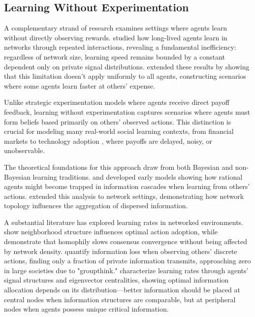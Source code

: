 \documentclass[a4paper,12pt]{report}
\begin{document}
\subsection{Learning Without Experimentation}

A complementary strand of research examines settings where agents learn without directly observing rewards. \citet{huang2024learning} studied how long-lived agents learn in networks through repeated interactions, revealing a fundamental inefficiency: regardless of network size, learning speed remains bounded by a constant dependent only on private signal distributions. \citet{brandl2024} extended these results by showing that this limitation doesn't apply uniformly to all agents, constructing scenarios where some agents learn faster at others' expense.

Unlike strategic experimentation models where agents receive direct payoff feedback, learning without experimentation captures scenarios where agents must form beliefs based primarily on others' observed actions. This distinction is crucial for modeling many real-world social learning contexts, from financial markets \citep{avery1998multidimensional} to technology adoption \citep{ellison1993rules}, where payoffs are delayed, noisy, or unobservable.

The theoretical foundations for this approach draw from both Bayesian and non-Bayesian learning traditions. \citet{gale2003bayesian} and \citet{smith2000pathological} developed early models showing how rational agents might become trapped in information cascades when learning from others' actions. \citet{acemoglu2011bayesian} extended this analysis to network settings, demonstrating how network topology influences the aggregation of dispersed information.

A substantial literature has explored learning rates in networked environments. \cite{bala1998learning} show neighborhood structure influences optimal action adoption, while \cite{golub2012homophily} demonstrate that homophily slows consensus convergence without being affected by network density. \cite{Harel2014TheSO} quantify information loss when observing others' discrete actions, finding only a fraction of private information transmits, approaching zero in large societies due to "groupthink." \cite{Jadbabaie2013InformationHA} characterize learning rates through agents' signal structures and eigenvector centralities, showing optimal information allocation depends on its distribution—better information should be placed at central nodes when information structures are comparable, but at peripheral nodes when agents possess unique critical information.
\end{document}
